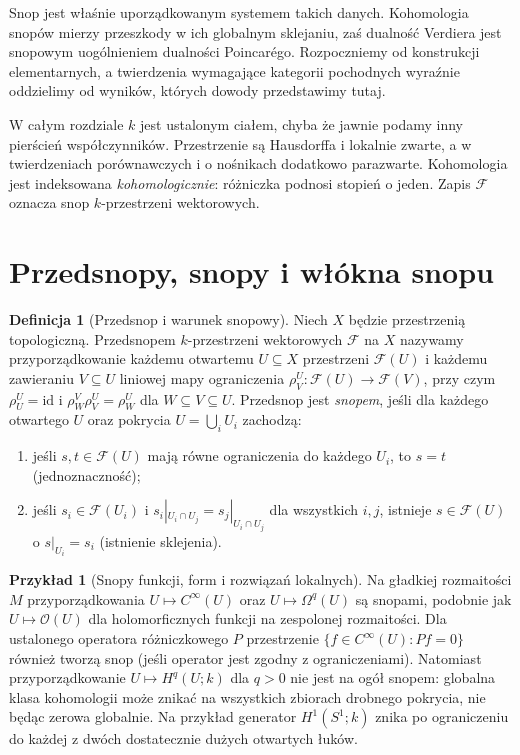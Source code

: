 \documentclass[11pt,a4paper,oneside]{report}
\newcommand{\id}{\mathrm{id}}
\theoremstyle{plain}
\theoremstyle{definition}
\newtheorem{definicja}[twierdzenie]{Definicja}
\newtheorem{przyklad}[twierdzenie]{Przykład}
\theoremstyle{remark}
\begin{document}
Snop jest właśnie uporządkowanym systemem takich danych. Kohomologia
snopów mierzy przeszkody w ich globalnym sklejaniu, zaś dualność Verdiera
jest snopowym uogólnieniem dualności Poincarégo. Rozpoczniemy od
konstrukcji elementarnych, a twierdzenia wymagające kategorii pochodnych
wyraźnie oddzielimy od wyników, których dowody przedstawimy tutaj.

W całym rozdziale $k$ jest ustalonym ciałem, chyba że jawnie podamy inny
pierścień współczynników. Przestrzenie są Hausdorffa i lokalnie zwarte,
a w twierdzeniach porównawczych i o nośnikach dodatkowo parazwarte.
Kohomologia jest indeksowana \emph{kohomologicznie}: różniczka podnosi
stopień o jeden. Zapis $\mathcal F$ oznacza snop $k$-przestrzeni wektorowych.

\section{Przedsnopy, snopy i włókna snopu}
\begin{definicja}[Przedsnop i warunek snopowy]
\label{def:sheaf-v12}
Niech $X$ będzie przestrzenią topologiczną. Przedsnopem
$k$-przestrzeni wektorowych $\mathcal F$ na $X$ nazywamy przyporządkowanie
każdemu otwartemu $U\subseteq X$ przestrzeni $\mathcal F(U)$ i każdemu
zawieraniu $V\subseteq U$ liniowej mapy ograniczenia
$\rho^U_V:\mathcal F(U)\to\mathcal F(V)$, przy czym
$\rho^U_U=\id$ i $\rho^V_W\rho^U_V=\rho^U_W$ dla $W\subseteq V\subseteq U$.
Przedsnop jest \emph{snopem}, jeśli dla każdego otwartego $U$ oraz
pokrycia $U=\bigcup_iU_i$ zachodzą:
\begin{enumerate}[label=(\roman*)]
\item jeśli $s,t\in\mathcal F(U)$ mają równe ograniczenia do każdego $U_i$,
  to $s=t$ (jednoznaczność);
\item jeśli $s_i\in\mathcal F(U_i)$ i
  $s_i|_{U_i\cap U_j}=s_j|_{U_i\cap U_j}$ dla wszystkich $i,j$,
  istnieje $s\in\mathcal F(U)$ o $s|_{U_i}=s_i$ (istnienie sklejenia).
\end{enumerate}
\end{definicja}

\begin{przyklad}[Snopy funkcji, form i rozwiązań lokalnych]
Na gładkiej rozmaitości $M$ przyporządkowania
$U\mapsto C^\infty(U)$ oraz $U\mapsto\Omega^q(U)$ są snopami,
podobnie jak $U\mapsto\mathcal O(U)$ dla holomorficznych funkcji na
zespolonej rozmaitości. Dla ustalonego operatora różniczkowego $P$
przestrzenie $\{f\in C^\infty(U):Pf=0\}$ również tworzą snop
(jeśli operator jest zgodny z ograniczeniami).
Natomiast przyporządkowanie $U\mapsto H^q(U;k)$ dla $q>0$ nie jest
na ogół snopem: globalna klasa kohomologii może znikać na wszystkich
zbiorach drobnego pokrycia, nie będąc zerowa globalnie.
Na przykład generator $H^1(S^1;k)$ znika po ograniczeniu
do każdej z dwóch dostatecznie dużych otwartych łuków.
\end{przyklad}
\end{document}
